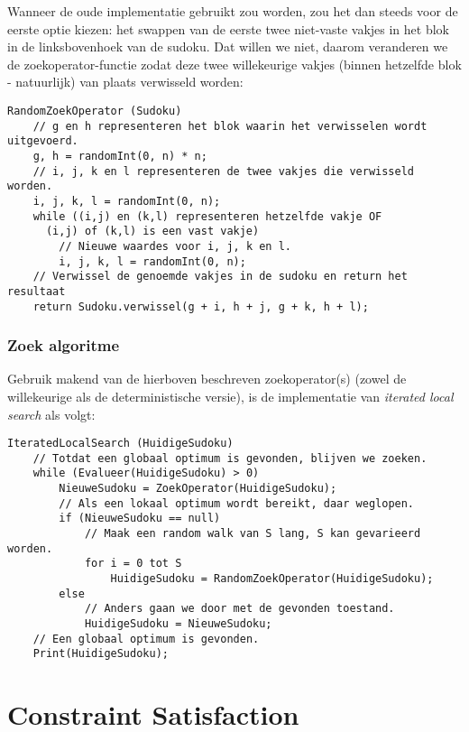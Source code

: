 \documentclass[]{report}
\begin{document}
Wanneer de oude implementatie gebruikt zou worden, zou het dan steeds voor de eerste optie kiezen: het swappen van de eerste twee niet-vaste vakjes in het blok in de linksbovenhoek van de sudoku. Dat willen we niet, daarom veranderen we de zoekoperator-functie zodat deze twee willekeurige vakjes (binnen hetzelfde blok - natuurlijk) van plaats verwisseld worden:

\begin{minipage}{\textwidth}
\begin{lstlisting}
RandomZoekOperator (Sudoku)
	// g en h representeren het blok waarin het verwisselen wordt uitgevoerd.
	g, h = randomInt(0, n) * n;
	// i, j, k en l representeren de twee vakjes die verwisseld worden.
	i, j, k, l = randomInt(0, n);
	while ((i,j) en (k,l) representeren hetzelfde vakje OF
	  (i,j) of (k,l) is een vast vakje)
		// Nieuwe waardes voor i, j, k en l.
		i, j, k, l = randomInt(0, n);
	// Verwissel de genoemde vakjes in de sudoku en return het resultaat
	return Sudoku.verwissel(g + i, h + j, g + k, h + l);
\end{lstlisting}
\end{minipage}

\subsubsection{Zoek algoritme}
Gebruik makend van de hierboven beschreven zoekoperator(s) (zowel de willekeurige als de deterministische versie), is de implementatie van \textit{iterated local search} als volgt:

\begin{minipage}{\textwidth}
\begin{lstlisting}
IteratedLocalSearch (HuidigeSudoku)
	// Totdat een globaal optimum is gevonden, blijven we zoeken.
	while (Evalueer(HuidigeSudoku) > 0)
		NieuweSudoku = ZoekOperator(HuidigeSudoku);
		// Als een lokaal optimum wordt bereikt, daar weglopen.
		if (NieuweSudoku == null)
			// Maak een random walk van S lang, S kan gevarieerd worden.
			for i = 0 tot S
				HuidigeSudoku = RandomZoekOperator(HuidigeSudoku);
		else 
			// Anders gaan we door met de gevonden toestand.
			HuidigeSudoku = NieuweSudoku;
	// Een globaal optimum is gevonden.
	Print(HuidigeSudoku);
\end{lstlisting}
\end{minipage}

\section{Constraint Satisfaction}
\end{document}
